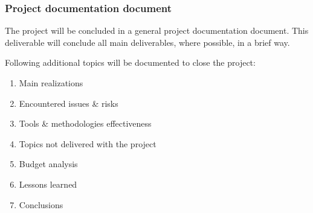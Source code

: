 \subsubsection{Project documentation document}
The project will be concluded in a general project documentation document.
This deliverable will conclude all main deliverables, where possible, in a brief way.

Following additional topics will be documented to close the project:
	\begin{enumerate}
		\item Main realizations
		\item Encountered issues \& risks
		\item Tools \& methodologies effectiveness
		\item Topics not delivered with the project
		\item Budget analysis
		\item Lessons learned
		\item Conclusions
	\end {enumerate}